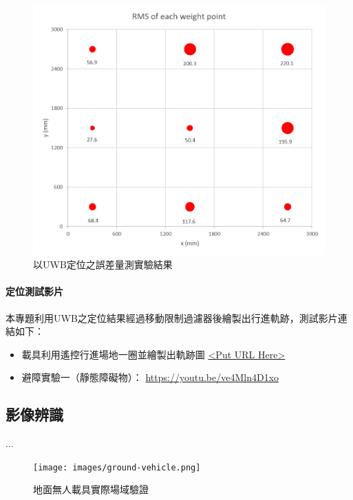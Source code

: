 \begin{figure}[bht]
	\centering
	\includegraphics[height=!,width=\linewidth,keepaspectratio=true]
	{images/uwb_bench.png}
	\caption{以UWB定位之誤差量測實驗結果}
	\label{figure:localization_result}
\end{figure}

\paragraph{定位測試影片} 

本專題利用UWB之定位結果經過移動限制過濾器後繪製出行進軌跡，測試影片連結如下：

\begin{itemize}

\item
載具利用遙控行進場地一圈並繪製出軌跡圖
\url{<Put URL Here>}

\item
避障實驗一（靜態障礙物）： 
\url{https://youtu.be/ve4Mln4D1xo}

\end{itemize}


\subsection{影像辨識}

...

\begin{figure}[h] %
\texttt{[image: images/ground-vehicle.png]}
\centering
\caption{地面無人載具實際場域驗證}
 \label{figure:ground-vehicle}
\end{figure}

